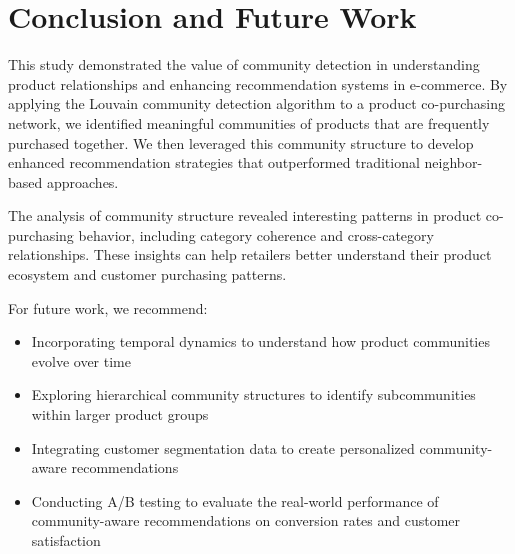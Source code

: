 \documentclass[conference]{IEEEtran}
\begin{document}
\section{Conclusion and Future Work}
This study demonstrated the value of community detection in understanding product relationships and enhancing recommendation systems in e-commerce. By applying the Louvain community detection algorithm to a product co-purchasing network, we identified meaningful communities of products that are frequently purchased together. We then leveraged this community structure to develop enhanced recommendation strategies that outperformed traditional neighbor-based approaches.

The analysis of community structure revealed interesting patterns in product co-purchasing behavior, including category coherence and cross-category relationships. These insights can help retailers better understand their product ecosystem and customer purchasing patterns.

For future work, we recommend:

\begin{itemize}
    \item Incorporating temporal dynamics to understand how product communities evolve over time
    \item Exploring hierarchical community structures to identify subcommunities within larger product groups
    \item Integrating customer segmentation data to create personalized community-aware recommendations
    \item Conducting A/B testing to evaluate the real-world performance of community-aware recommendations on conversion rates and customer satisfaction
\end{itemize}



\end{document}
